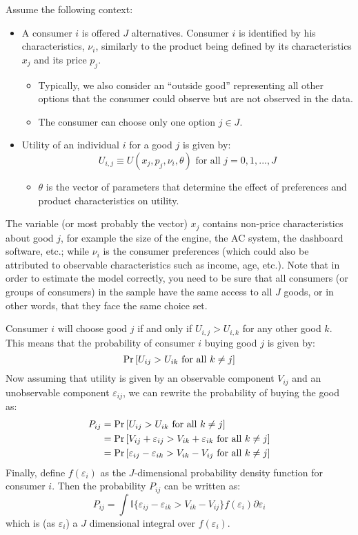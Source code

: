 Assume the following context:\begin{itemize}
\item A consumer $i$ is offered $J$ alternatives. Consumer $i$ is identified by his characteristics, $\nu_i$, similarly to the product being defined by its characteristics $x_j$ and its price $p_j$.
\begin{itemize}
\item Typically, we also consider an ``outside good'' representing all other options that the consumer could observe but are not observed in the data.
\item The consumer can choose only one option $j\in J$.
\end{itemize}
\item Utility of an individual $i$ for a good $j$ is given by: $$U_{i,j} \equiv U(x_j, p_j, \nu_i, \theta) \text{ for all } j = 0, 1, ..., J $$
\begin{itemize}
\item $\theta$ is the vector of parameters that determine the effect of preferences and product characteristics on utility.
\end{itemize}
\end{itemize}  The variable (or most probably the vector) $x_j$ contains non-price characteristics about good $j$, for example the size of the engine, the AC system, the dashboard software, etc.; while $\nu_i$ is the consumer preferences (which could also be attributed to observable characteristics such as income, age, etc.). Note that in order to estimate the model correctly, you need to be sure that all consumers (or groups of consumers) in the sample have the same access to all $J$ goods, or in other words, that they face the same choice set.

Consumer $i$ will choose good $j$ if and only if $U_{i,j} > U_{i, k}$ for any other good $k$. This means that the probability of consumer $i$ buying good $j$ is given by: $$\operatorname{Pr}\left[U_{ij}>U_{ik}\text{ for all } k\neq j\right] $$ Now assuming that utility is given by an observable component $V_{ij}$ and an unobservable component $\varepsilon_{ij}$, we can rewrite the probability of buying the good as: \begin{align*} P_{ij} & = \operatorname{Pr}\left[U_{ij}>U_{ik}\text{ for all } k\neq j\right] \\
& = \operatorname{Pr}\left[V_{ij}+\varepsilon_{ij}>V_{ik}+\varepsilon_{ik}\text{ for all } k\neq j\right] \\
& = \operatorname{Pr}\left[\varepsilon_{ij} - \varepsilon_{ik} > V_{ik} - V_{ij} \text{ for all } k\neq j\right]
\end{align*} Finally, define $f(\varepsilon_i)$ as the $J$-dimensional probability density function for consumer $i$. Then the probability $P_{ij}$ can be written as: $$P_{ij} = \int \mathbb{I}\{\varepsilon_{ij} - \varepsilon_{ik} > V_{ik} - V_{ij}\}f(\varepsilon_i)\partial \varepsilon_i $$ which is (as $\varepsilon_i$) a $J$ dimensional integral over $f(\varepsilon_i)$.


